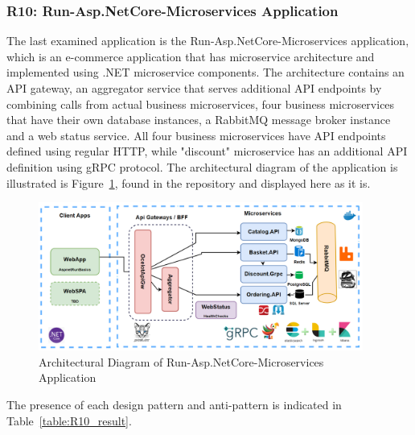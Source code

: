 \documentclass{Configuration_Files/PoliMi3i_thesis}
\begin{document}
\subsubsection{R10: Run-Asp.NetCore-Microservices Application}
\label{subsubsec:R10}

The last examined application is the Run-Asp.NetCore-Microservices application, which is an e-commerce application that has microservice architecture and implemented using .NET microservice components.
The architecture contains an API gateway, an aggregator service that serves additional API endpoints by combining calls from actual business microservices, four business microservices that have their own database instances, a RabbitMQ message broker instance and a web status service.
All four business microservices have API endpoints defined using regular HTTP, while "discount" microservice has an additional API definition using gRPC protocol.
The architectural diagram of the application is illustrated is Figure~\ref{fig:R10_arch}, found in the repository and displayed here as it is.

\begin{figure}[H]
\centering
\includegraphics[width=0.95\textwidth]{myImages/R10.png}
\caption{Architectural Diagram of Run-Asp.NetCore-Microservices Application}
\label{fig:R10_arch}
\end{figure}

The presence of each design pattern and anti-pattern is indicated in Table~\ref{table:R10_result}.
\end{document}
